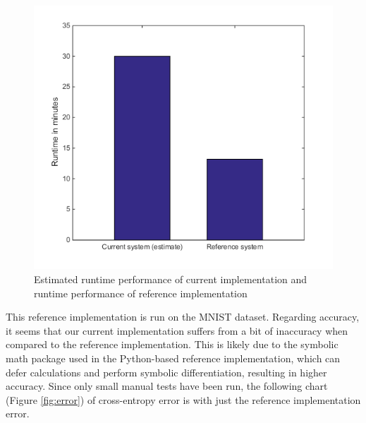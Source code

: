 \documentclass{sig-alternate}
\begin{document}
\begin{figure}[h]
	\begin{center}
		\includegraphics[width=1\linewidth]{performance.png}
	\end{center}
	\vspace{-12pt}
	\caption{Estimated runtime performance of current implementation and runtime performance of reference implementation}
	\label{fig:performance}
\end{figure}

This reference implementation is run on the MNIST dataset.
Regarding accuracy, it seems that our current implementation suffers from a bit of inaccuracy
when compared to the reference implementation. This is likely due to the symbolic math
package used in the Python-based reference implementation, which can defer calculations
and perform symbolic differentiation, resulting in higher accuracy. Since only
small manual tests have been run, the following chart (Figure \ref{fig:error}) of cross-entropy error is with just the
reference implementation error. 
\end{document}
